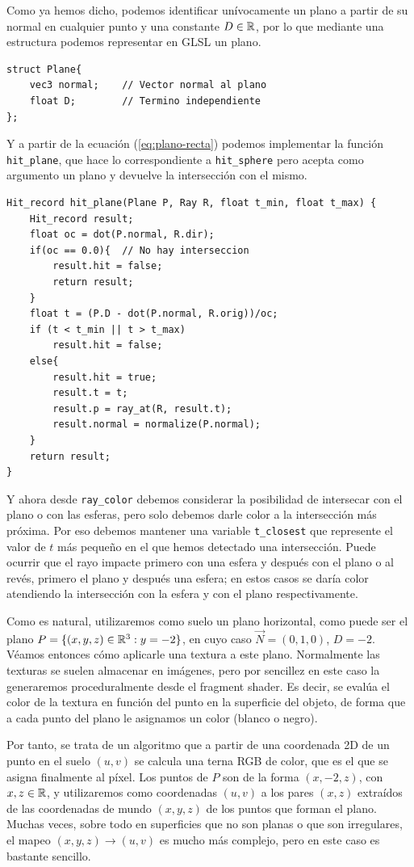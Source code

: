 Como ya hemos dicho, podemos identificar unívocamente un plano a partir de su normal en cualquier punto y una constante $D\in\mathbb{R}$, por lo que mediante una estructura podemos representar en GLSL un plano.

\begin{lstlisting}
struct Plane{
    vec3 normal;    // Vector normal al plano
    float D;        // Termino independiente
};
\end{lstlisting}

Y a partir de la ecuación (\ref{eq:plano-recta}) podemos implementar la función \verb|hit_plane|, que hace lo correspondiente a \verb|hit_sphere| pero acepta como argumento un plano y devuelve la intersección con el mismo.

\begin{lstlisting}
Hit_record hit_plane(Plane P, Ray R, float t_min, float t_max) {
    Hit_record result;
    float oc = dot(P.normal, R.dir);
    if(oc == 0.0){  // No hay interseccion
        result.hit = false;
        return result;
    }
    float t = (P.D - dot(P.normal, R.orig))/oc;
    if (t < t_min || t > t_max)
        result.hit = false;
    else{
        result.hit = true;
        result.t = t;
        result.p = ray_at(R, result.t);
        result.normal = normalize(P.normal);
    }
    return result;
}
\end{lstlisting}

Y ahora desde \verb|ray_color| debemos considerar la posibilidad de intersecar con el plano o con las esferas, pero solo debemos darle color a la intersección más próxima. Por eso debemos mantener una variable \verb|t_closest| que represente el valor de $t$ más pequeño en el que hemos detectado una intersección. Puede ocurrir que el rayo impacte primero con una esfera y después con el plano o al revés, primero el plano y después una esfera; en estos casos se daría color atendiendo la intersección con la esfera y con el plano respectivamente. 

Como es natural, utilizaremos como suelo un plano horizontal, como puede ser el plano $P=\{(x,y,z)\in\mathbb{R}^3:y=-2\}$, en cuyo caso $\vec N=(0,1,0)$, $D=-2$. Véamos entonces cómo aplicarle una textura a este plano. Normalmente las texturas se suelen almacenar en imágenes, pero por sencillez en este caso la generaremos proceduralmente desde el fragment shader. Es decir, se evalúa el color de la textura en función del punto en la superficie del objeto, de forma que a cada punto del plano le asignamos un color (blanco o negro). 

Por tanto, se trata de un algoritmo que a partir de una coordenada 2D de un punto en el suelo $(u,v)$ se calcula una terna RGB de color, que es el que se asigna finalmente al píxel. Los puntos de $P$ son de la forma $(x,-2,z)$, con $ x,z\in\mathbb{R}$, y utilizaremos como coordenadas $(u,v)$ a los pares $(x,z)$ extraídos de las coordenadas de mundo $(x,y,z)$ de los puntos que forman el plano. Muchas veces, sobre todo en superficies que no son planas o que son irregulares, el mapeo $(x,y,z)\longrightarrow(u,v)$ es mucho más complejo, pero en este caso es bastante sencillo.

